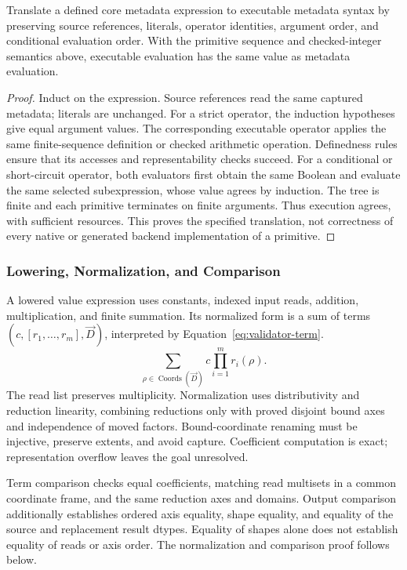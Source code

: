 \begin{lemma}
\label{lem:metadata-emission}
Translate a defined core metadata expression to executable metadata syntax
by preserving source references, literals, operator identities, argument
order, and conditional evaluation order. With the primitive sequence and
checked-integer semantics above, executable evaluation has the same value
as metadata evaluation.
\end{lemma}
\begin{proof}
Induct on the expression. Source references read the same captured metadata;
literals are unchanged. For a strict operator, the induction hypotheses
give equal argument values. The corresponding executable operator applies
the same finite-sequence definition or checked arithmetic operation.
Definedness rules ensure that its accesses and representability checks
succeed. For a conditional or short-circuit operator, both evaluators first
obtain the same Boolean and evaluate the same selected subexpression,
whose value agrees by induction. The tree is finite and each primitive
terminates on finite arguments. Thus execution agrees, with sufficient
resources. This proves the specified translation, not correctness of every
native or generated backend implementation of a primitive.
\end{proof}

\subsubsection{Lowering, Normalization, and Comparison}
A lowered value expression uses constants, indexed input reads, addition,
multiplication, and finite summation. Its normalized form is a sum of
terms $(c,[r_1,\ldots,r_m],\vec D)$, interpreted by
Equation~\eqref{eq:validator-term}.
\begin{equation}
 \sum_{\rho\in\operatorname{Coords}(\vec D)}c\prod_{i=1}^{m}r_i(\rho).
 \label{eq:validator-term}
\end{equation}
The read list preserves multiplicity. Normalization uses distributivity
and reduction linearity, combining reductions only with proved disjoint
bound axes and independence of moved factors. Bound-coordinate renaming
must be injective, preserve extents, and avoid capture. Coefficient
computation is exact; representation overflow leaves the goal unresolved.

Term comparison checks equal coefficients, matching read multisets in a
common coordinate frame, and the same reduction axes and domains. Output
comparison additionally establishes ordered axis equality, shape equality,
and equality of the source and replacement result dtypes. Equality of shapes alone does not establish equality
of reads or axis order. The normalization and comparison proof follows below.


